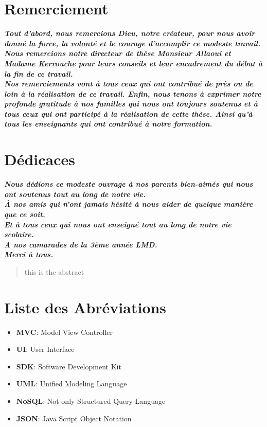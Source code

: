 \documentclass[french, a4paper, french]{report}
\begin{document}
\chapter*{Remerciement}
\begin{center}
\Large \textbf{\textit{Tout d'abord, nous remercions Dieu, notre créateur, pour nous avoir donné la force, la volonté et le courage d'accomplir ce modeste travail.\\
Nous remercions notre directeur de thèse Monsieur Allaoui et Madame Kerrouche pour leurs conseils et leur encadrement du début à la fin de ce travail.\\
Nos remerciements vont à tous ceux qui ont contribué de près ou de loin à la réalisation de ce travail. Enfin, nous tenons à exprimer notre profonde gratitude à nos familles qui nous ont toujours soutenus et à tous ceux qui ont participé à la réalisation de cette thèse. Ainsi qu'à tous les enseignants qui ont contribué à notre formation.}}
\end{center}

\chapter*{Dédicaces}
\begin{center}
\Large \textbf{\textit{Nous dédions ce modeste ouvrage à nos parents bien-aimés qui nous ont soutenus tout au long de notre vie.\\
À nos amis qui n'ont jamais hésité à nous aider de quelque manière que ce soit.\\
Et à tous ceux qui nous ont enseigné tout au long de notre vie scolaire.\\
A nos camarades de la 3ème année LMD.\\
Merci à tous.}}
\end{center}

\newpage
\begin{abstract}
this is the abstract
\end{abstract}


\tableofcontents

\newpage
\listoffigures


\newpage
\chapter*{Liste des Abréviations}
	\begin{itemize}
		\item \textbf{MVC}:  Model View Controller
		\item \textbf{UI}: User Interface
		\item \textbf{SDK}: Software Development Kit
		\item \textbf{UML}: Unified Modeling Language
		\item \textbf{NoSQL}: Not only Structured Query Language
		\item \textbf{JSON}:  Java Script Object Notation
	\end{itemize}
\end{document}
